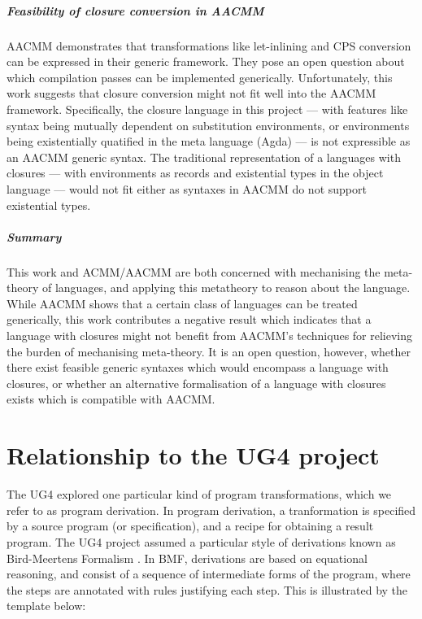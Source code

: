 \documentclass[bsc,frontabs,oneside,singlespacing,parskip,deptreport]{infthesis}
\theoremstyle{definition}
\theoremstyle{lemma}
\begin{document}
\paragraph{Feasibility of closure conversion in AACMM}
AACMM demonstrates that transformations like let-inlining and CPS
conversion can be expressed in their generic framework. They pose an
open question about which compilation passes can be implemented
generically. Unfortunately, this work suggests that closure conversion
might not fit well into the AACMM framework. Specifically, the closure
language in this project --- with features like syntax being mutually
dependent on substitution environments, or environments being
existentially quatified in the meta language (Agda) --- is not
expressible as an AACMM generic syntax. The traditional representation
of a languages with closures --- with environments as records and
existential types in the object language --- would not fit either as
syntaxes in AACMM do not support existential types.

\paragraph{Summary}
This work and ACMM/AACMM are both concerned with mechanising the
meta-theory of languages, and applying this metatheory to reason about
the language. While AACMM shows that a certain class of languages can
be treated generically, this work contributes a negative result which
indicates that a language with closures might not benefit from AACMM's
techniques for relieving the burden of mechanising meta-theory. It
is an open question, however, whether there exist feasible generic
syntaxes which would encompass a language with closures, or whether an
alternative formalisation of a language with closures exists which is
compatible with AACMM.

\chapter{Relationship to the UG4 project}
\label{cha:relat-ug4-proj}

The UG4 explored one particular kind of program transformations, which
we refer to as program derivation. In program derivation, a
tranformation is specified by a source program (or specification), and
a recipe for obtaining a result program. The UG4 project assumed a
particular style of derivations known as Bird-Meertens Formalism
\cite{gibbons1994introduction}. In BMF, derivations are based on
equational reasoning, and consist of a sequence of intermediate forms
of the program, where the steps are annotated with rules justifying
each step. This is illustrated by the template below:
\end{document}
